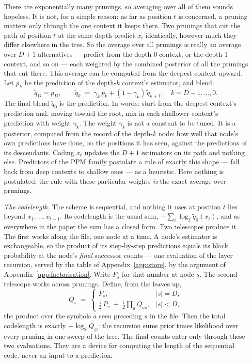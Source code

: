 \documentclass[11pt]{article}
\begin{document}
There are exponentially many prunings, so averaging over all of them
sounds hopeless.  It is not, for a simple reason: as far as position
$t$ is concerned, a pruning matters only through the one context it
keeps there.  Two prunings that cut the path of position $t$ at the
same depth predict $x_t$ identically, however much they differ
elsewhere in the tree.  So the average over all prunings is really an
average over $D{+}1$ alternatives --- predict from the depth-$0$
context, or the depth-$1$ context, and so on --- each weighted by the
combined posterior of all the prunings that cut there.  This average
can be computed from the deepest context upward.  Let $p_k$ be the
prediction of the depth-$k$ context's estimator, and blend:
\begin{equation*}
  \tilde q_{D} = p_{D},
  \qquad
  \tilde q_{k}
  \;=\;
  \gamma_k\, p_{k} + (1-\gamma_k)\, \tilde q_{k+1},
  \quad k = D{-}1, \dots, 0.
\end{equation*}
The final blend $\tilde q_0$ is the prediction.  In words: start
from the deepest context's prediction and, moving toward the root,
mix in each shallower context's prediction with weight $\gamma_k$.
The weight $\gamma_k$ is not a constant to be tuned.  It is a
posterior, computed from the record of the depth-$k$ node: how well
that node's own predictions have done, on the positions it has seen,
against the predictions of its descendants.  Coding $x_t$ updates
the $D{+}1$ estimators on its path and nothing else.  Predictors of
the PPM family postulate a rule of exactly this shape --- fall back
from deep contexts to shallow ones --- as a heuristic.  Here nothing
is postulated: the rule with these particular weights \emph{is} the
exact average over prunings.

\emph{The codelength.}  The scheme is sequential, and nothing it uses
at position $t$ lies beyond $x_1, \dots, x_{t-1}$.  Its codelength is
the usual sum, $-\sum_t \log_2 \tilde q_0(x_t)$, and as everywhere in
the paper the sum has a closed form.  Two telescopes produce it.  The
first works along the file, one node at a time.  A node's estimator
is exchangeable, so the product of its step-by-step predictions
equals its block probability at the node's \emph{final} successor
counts --- one evaluation of the layer recursion, served by the
table of Appendix~\ref{app:store}, by the argument of
Appendix~\ref{app:factorisation}.
Write $P_s$ for that number at node $s$.  The second telescope works
across prunings.  Define, from the leaves up,
\begin{equation*}
  Q_s \;=\;
  \begin{cases}
    P_s, & |s| = D,\\[2pt]
    \tfrac12\, P_s \;+\; \tfrac12 \prod_{a} Q_{as}, & |s| < D,
  \end{cases}
\end{equation*}
the product over the symbols $a$ seen preceding $s$ in the file.
Then the total codelength is exactly $-\log_2 Q_{\varnothing}$: the
recursion sums prior times likelihood over every pruning in one sweep
of the tree.  The final counts enter only through these two
evaluations.  They are a device for computing the length of the
sequential code, never an input to a prediction.
\end{document}
